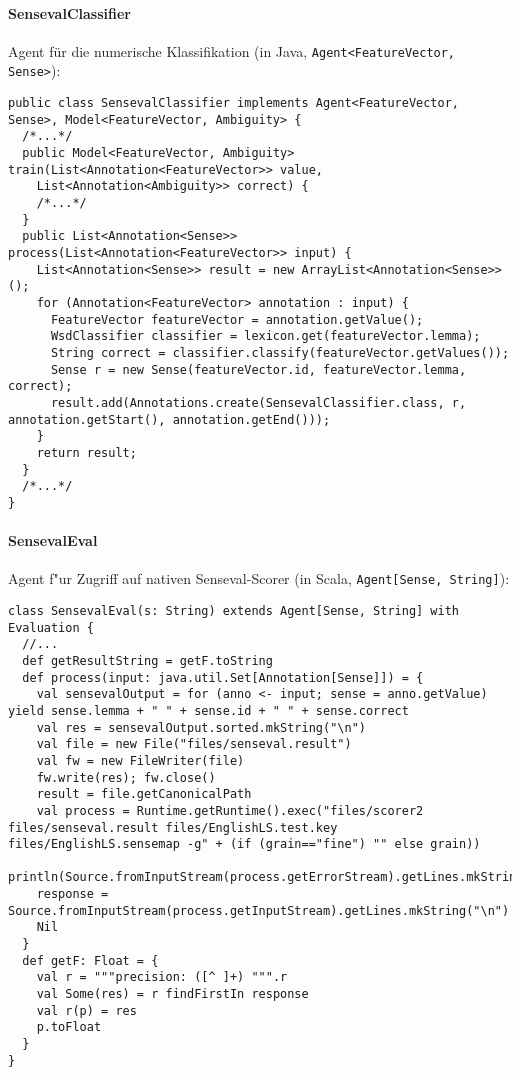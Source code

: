 \documentclass[abstracton, 12pt]{scrartcl}
\begin{document}
\paragraph{SensevalClassifier}

Agent für die numerische Klassifikation (in Java, \lstinline!Agent<FeatureVector, Sense>!):

\begin{lstlisting}
public class SensevalClassifier implements Agent<FeatureVector, Sense>, Model<FeatureVector, Ambiguity> {
  /*...*/
  public Model<FeatureVector, Ambiguity> train(List<Annotation<FeatureVector>> value,
    List<Annotation<Ambiguity>> correct) {
    /*...*/
  }
  public List<Annotation<Sense>> process(List<Annotation<FeatureVector>> input) {
    List<Annotation<Sense>> result = new ArrayList<Annotation<Sense>>();
    for (Annotation<FeatureVector> annotation : input) {
      FeatureVector featureVector = annotation.getValue();
      WsdClassifier classifier = lexicon.get(featureVector.lemma);
      String correct = classifier.classify(featureVector.getValues());
      Sense r = new Sense(featureVector.id, featureVector.lemma, correct);
      result.add(Annotations.create(SensevalClassifier.class, r, annotation.getStart(), annotation.getEnd()));
    }
    return result;
  }
  /*...*/
}
\end{lstlisting}

\paragraph{SensevalEval}

Agent f"ur Zugriff auf nativen Senseval-Scorer (in Scala, \lstinline!Agent[Sense, String]!):

\begin{lstlisting}
class SensevalEval(s: String) extends Agent[Sense, String] with Evaluation {
  //...
  def getResultString = getF.toString
  def process(input: java.util.Set[Annotation[Sense]]) = {
    val sensevalOutput = for (anno <- input; sense = anno.getValue) yield sense.lemma + " " + sense.id + " " + sense.correct
    val res = sensevalOutput.sorted.mkString("\n")
    val file = new File("files/senseval.result")
    val fw = new FileWriter(file)
    fw.write(res); fw.close()
    result = file.getCanonicalPath
    val process = Runtime.getRuntime().exec("files/scorer2 files/senseval.result files/EnglishLS.test.key files/EnglishLS.sensemap -g" + (if (grain=="fine") "" else grain))
    println(Source.fromInputStream(process.getErrorStream).getLines.mkString("\n"))
    response = Source.fromInputStream(process.getInputStream).getLines.mkString("\n")
    Nil
  }
  def getF: Float = {
    val r = """precision: ([^ ]+) """.r
    val Some(res) = r findFirstIn response
    val r(p) = res
    p.toFloat
  }
}
\end{lstlisting}
\end{document}
